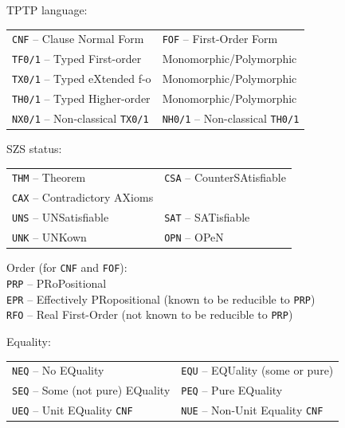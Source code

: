 \documentclass{easychair}
\newenvironment{packed_itemize}{
\vspace*{-0.2em}
\begin{itemize}
\setlength{\partopsep}{0pt}
\setlength{\itemsep}{1pt}
\setlength{\parskip}{0pt}
\setlength{\parsep}{0pt}
}{\end{itemize}}
\begin{document}
\begin{figure}[bht]
\centering
\begin{packed_itemize}
\item TPTP language: \\
      \begin{tabular}{@{}p{5cm}l}
      {\tt CNF} -- Clause Normal Form &
      {\tt FOF} -- First-Order Form \\
      {\tt TF0/1} -- Typed First-order & Monomorphic/Polymorphic \\
      {\tt TX0/1} -- Typed eXtended f-o & Monomorphic/Polymorphic \\
      {\tt TH0/1} -- Typed Higher-order & Monomorphic/Polymorphic \\
      {\tt NX0/1} -- Non-classical {\tt TX0/1} &
      {\tt NH0/1} -- Non-classical {\tt TH0/1} \\
      \end{tabular}
\item SZS status: \\
      \begin{tabular}{@{}p{5cm}l}
      {\tt THM} -- Theorem &
      {\tt CSA} -- CounterSAtisfiable \\
      {\tt CAX} -- Contradictory AXioms & \\
      {\tt UNS} -- UNSatisfiable &
      {\tt SAT} -- SATisfiable \\
      {\tt UNK} -- UNKown &
      {\tt OPN} -- OPeN \\
      \end{tabular}
\item Order (for {\tt CNF} and {\tt FOF}): \\
      {\tt PRP} -- PRoPositional \\
      {\tt EPR} -- Effectively PRopositional (known to be reducible to {\tt PRP}) \\
      {\tt RFO} -- Real First-Order (not known to be reducible to {\tt PRP})
\item Equality: \\
      \begin{tabular}{@{}p{5cm}l}
      {\tt NEQ} -- No EQuality &
      {\tt EQU} -- EQUality (some or pure) \\
      {\tt SEQ} -- Some (not pure) EQuality &
      {\tt PEQ} -- Pure EQuality \\
      {\tt UEQ} -- Unit EQuality {\tt CNF} &
      {\tt NUE} -- Non-Unit Equality {\tt CNF} \\
      \end{tabular}

\end{packed_itemize}
\end{figure}
\end{document}
